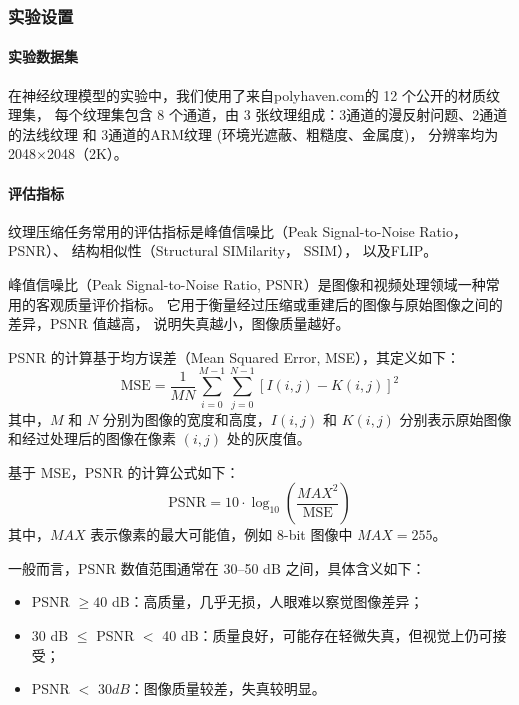 \subsubsection{实验设置}

\paragraph{实验数据集}

在神经纹理模型的实验中，我们使用了来自polyhaven.com\cite{PolyHaven}的 12 个公开的材质纹理集，
每个纹理集包含 8 个通道，由 3 张纹理组成：3通道的漫反射问题、2通道的法线纹理 和 3通道的ARM纹理 (环境光遮蔽、粗糙度、金属度)，
分辨率均为2048×2048（2K）。

\paragraph{评估指标}

纹理压缩任务常用的评估指标是峰值信噪比（Peak Signal-to-Noise Ratio，PSNR）、
结构相似性（Structural SIMilarity， SSIM）\cite{wang2004image}，
以及FLIP\cite{andersson2020flip}。

峰值信噪比（Peak Signal-to-Noise Ratio, PSNR）是图像和视频处理领域一种常用的客观质量评价指标。
它用于衡量经过压缩或重建后的图像与原始图像之间的差异，PSNR 值越高，
说明失真越小，图像质量越好。

PSNR 的计算基于均方误差（Mean Squared Error, MSE），其定义如下：
\begin{equation}
\text{MSE} = \frac{1}{MN} \sum_{i=0}^{M-1} \sum_{j=0}^{N-1} \left[ I(i,j) - K(i,j) \right]^2
\end{equation}
其中，$M$ 和 $N$ 分别为图像的宽度和高度，$I(i,j)$ 和 $K(i,j)$ 分别表示原始图像和经过处理后的图像在像素 $(i,j)$ 处的灰度值。

基于 MSE，PSNR 的计算公式如下：
\begin{equation}
    \text{PSNR} = 10 \cdot \log_{10} \left( \frac{MAX^2}{\text{MSE}} \right)
\end{equation}
其中，$MAX$ 表示像素的最大可能值，例如 8-bit 图像中 $MAX = 255$。

一般而言，PSNR 数值范围通常在 30–50 dB 之间，具体含义如下：
\begin{itemize}
    \item PSNR $\geq 40$ dB：高质量，几乎无损，人眼难以察觉图像差异；
    \item 30 dB $\leq$ PSNR $<$ 40 dB：质量良好，可能存在轻微失真，但视觉上仍可接受；
    \item PSNR $<$ 30$ dB$：图像质量较差，失真较明显。
\end{itemize}

